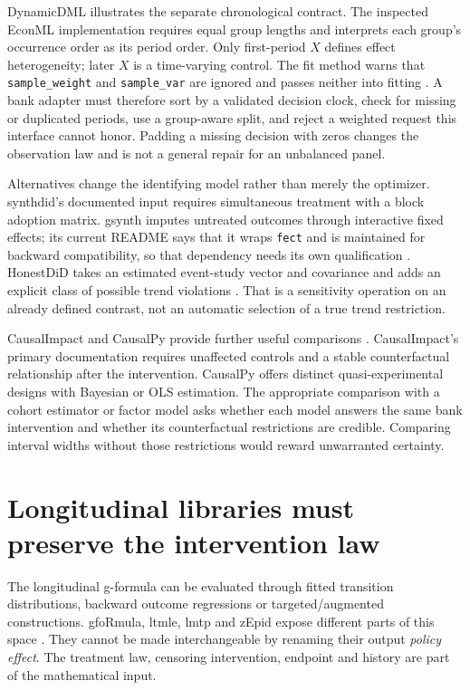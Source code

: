 DynamicDML illustrates the separate chronological contract. The inspected
EconML implementation requires equal group lengths and interprets each
group's occurrence order as its period order. Only first-period $X$
defines effect heterogeneity; later $X$ is a time-varying control. The
fit method warns that \texttt{sample\_weight} and \texttt{sample\_var}
are ignored and passes neither into fitting \citep{sw_econml}. A bank
adapter must therefore sort by a validated decision clock, check for
missing or duplicated periods, use a group-aware split, and reject a
weighted request this interface cannot honor. Padding a missing decision
with zeros changes the observation law and is not a general repair for
an unbalanced panel.

Alternatives change the identifying model rather than merely the optimizer.
synthdid's documented input requires simultaneous treatment with a block
adoption matrix. gsynth imputes untreated outcomes through interactive
fixed effects; its current README says that it wraps \texttt{fect} and is
maintained for backward compatibility, so that dependency needs its own
qualification \citep{sw_synthdid,sw_gsynth}. HonestDiD takes an estimated
event-study vector and covariance and adds an explicit class of possible
trend violations \citep{sw_honestdid}. That is a sensitivity operation on
an already defined contrast, not an automatic selection of a true trend
restriction.

CausalImpact and CausalPy provide further useful comparisons
\citep{sw_causalimpact,sw_causalpy}. CausalImpact's primary documentation
requires unaffected controls and a stable counterfactual relationship
after the intervention. CausalPy offers distinct quasi-experimental
designs with Bayesian or OLS estimation. The appropriate comparison with
a cohort estimator or factor model asks whether each model answers the
same bank intervention and whether its counterfactual restrictions are
credible. Comparing interval widths without those restrictions would
reward unwarranted certainty.

\section{Longitudinal libraries must preserve the intervention law}
\label{r3:software-longitudinal}

The longitudinal g-formula can be evaluated through fitted transition
distributions, backward outcome regressions or targeted/augmented
constructions. gfoRmula, ltmle, lmtp and zEpid expose different parts of
this space \citep{sw_gformula,sw_ltmle,sw_lmtp,sw_zepid}. They cannot be
made interchangeable by renaming their output \emph{policy effect}.
The treatment law, censoring intervention, endpoint and history are part
of the mathematical input.

